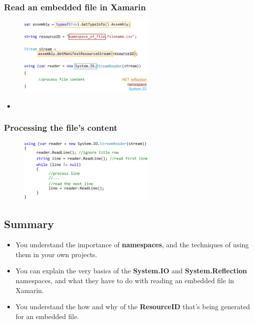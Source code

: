 \documentclass{article}
\newcommand{\bold}[1]{\textbf{#1}}
\begin{document}
\subsubsection{Read an embedded file in Xamarin}

\begin{figure}[H]
    \centering
    \includegraphics[width=0.6\textwidth]{embedded-files.png}
    \caption{}
\end{figure}

\begin{itemize}
    \item 
\end{itemize}

\subsubsection{Processing the file's content}

\begin{figure}[H]
    \centering
    \includegraphics[width=0.6\textwidth]{embedded-files2.png}
    \caption{}
\end{figure}

\subsection{Summary}

\begin{itemize}
    \item You understand the importance of \bold{namespaces}, and the techniques of using them in your own projects.
    \item You can explain the very basics of the \bold{System.IO} and \bold{System.Reflection} namespaces, and what they have to do with reading an embedded file in Xamarin.
    \item You understand the how and why of the \bold{ResourceID} that’s being generated for an embedded file.
\end{itemize}
\end{document}
